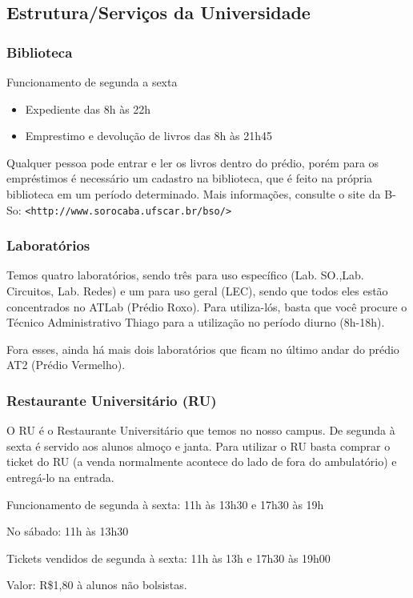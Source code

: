 \subsection{Estrutura/Serviços da Universidade}

\subsubsection{Biblioteca}
\noindent Funcionamento de segunda a sexta
\begin{itemize}
  \item Expediente das 8h às 22h
  \item Emprestimo e devolução de livros das 8h às 21h45
\end{itemize}
\noindent Qualquer pessoa pode entrar e ler os livros dentro do prédio, porém para os empréstimos é necessário um cadastro na biblioteca, que é feito na própria biblioteca em um período determinado. Mais informações, consulte o site da B-So:
\texttt{<http://www.sorocaba.ufscar.br/bso/>}

\subsubsection{Laboratórios}
Temos quatro laboratórios, sendo três para uso específico (Lab. SO.,Lab. Circuitos, Lab. Redes) e um para uso geral (LEC), sendo que todos eles estão concentrados no ATLab (Prédio Roxo). Para utiliza-lós, basta que você procure o Técnico Administrativo Thiago para a utilização no período diurno (8h-18h).

Fora esses, ainda há mais dois laboratórios que ficam no último andar do prédio AT2 (Prédio Vermelho).

\subsubsection{Restaurante Universitário (RU)}
O RU é o Restaurante Universitário que temos no nosso campus. De segunda à sexta é servido aos alunos almoço e janta. Para utilizar o RU basta comprar o ticket do RU (a venda normalmente acontece do lado de fora do ambulatório) e entregá-lo na entrada.

Funcionamento de segunda à sexta: 11h às 13h30 e 17h30 às 19h

No sábado: 11h às 13h30

Tickets vendidos de segunda à sexta: 11h às 13h e 17h30 às 19h00

Valor: R\$1,80 à alunos não bolsistas.

